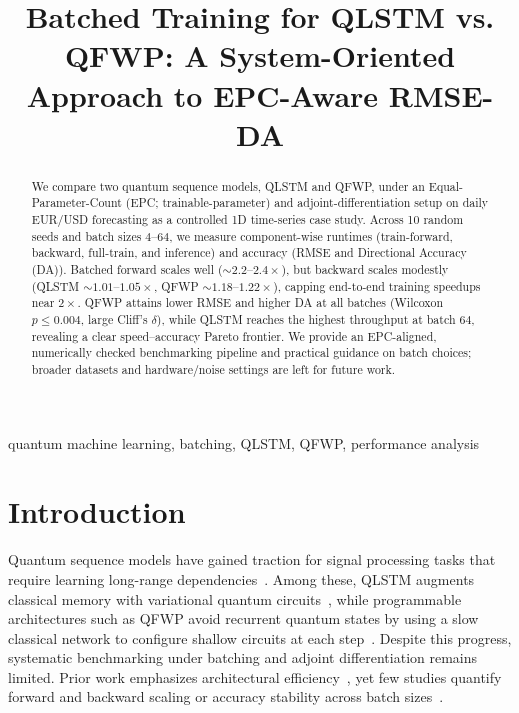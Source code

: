 \documentclass{article}
\title{Batched Training for QLSTM vs. QFWP: A System-Oriented Approach to EPC-Aware RMSE-DA}
\begin{document}
%
\maketitle
%
\begin{abstract}
We compare two quantum sequence models, QLSTM and QFWP, under an Equal-Parameter-Count (EPC; trainable-parameter) and adjoint-differentiation setup on daily EUR/USD forecasting as a controlled 1D time-series case study. Across 10 random seeds and batch sizes $4$--$64$, we measure component-wise runtimes (train-forward, backward, full-train, and inference) and accuracy (RMSE and Directional Accuracy (DA)). Batched forward scales well ($\sim 2.2$--$2.4\times$), but backward scales modestly (QLSTM $\sim 1.01$--$1.05\times$, QFWP $\sim 1.18$--$1.22\times$), capping end-to-end training speedups near $2\times$. QFWP attains lower RMSE and higher DA at all batches (Wilcoxon $p \le 0.004$, large Cliff's $\delta$), while QLSTM reaches the highest throughput at batch $64$, revealing a clear speed--accuracy Pareto frontier. We provide an EPC-aligned, numerically checked benchmarking pipeline and practical guidance on batch choices; broader datasets and hardware/noise settings are left for future work.
\end{abstract}

%
\begin{keywords}
quantum machine learning, batching, QLSTM, QFWP, performance analysis
\end{keywords}
%
\section{Introduction}\label{sec:introduction}
Quantum sequence models have gained traction for signal processing tasks that require learning long-range dependencies~\cite{schuld2015introduction,Schuld2019,parcollet2019bidirectional}. Among these, QLSTM augments classical memory with variational quantum circuits~\cite{chen2022quantum}, while programmable architectures such as QFWP avoid recurrent quantum states by using a slow classical network to configure shallow circuits at each step~\cite{chen2024learning,liu2025programming}. Despite this progress, systematic benchmarking under batching and adjoint differentiation remains limited. Prior work emphasizes architectural efficiency~\cite{dehghani2021efficiency,chen2022quantum_qcnn}, yet few studies quantify forward and backward scaling or accuracy stability across batch sizes~\cite{hoch2024variational}. 
\end{document}
